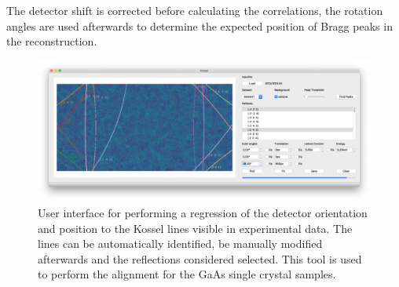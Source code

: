 The detector shift is corrected before calculating the correlations, the rotation angles are used afterwards to determine the expected position of Bragg peaks in the reconstruction.
\begin{figure}
	\centering
	\includegraphics[width=0.8\linewidth]{images/kosselfit.png}
	\caption[User Interface for Kossel line based alignment]{User interface for performing a regression of the detector orientation and position to the Kossel lines visible in experimental data. The lines can be automatically identified,  be  manually modified afterwards and the reflections considered selected. This tool is used to perform the alignment for the GaAs single crystal samples.}
	\label{fig:kosselfit}
\end{figure}




